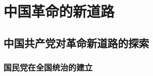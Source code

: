 \documentclass[10pt, UTF8]{book} %
\begin{document}



\chapter{中国革命的新道路}
\thispagestyle{empty}




\section{中国共产党对革命新道路的探索}

\subsection{国民党在全国统治的建立}
\end{document}
